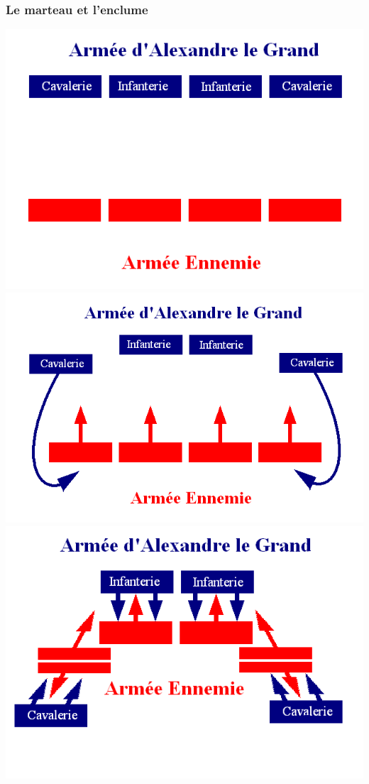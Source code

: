 \documentclass{article}
\begin{document}
\subsubsection{Le marteau et l'enclume}
\includegraphics[width=\linewidth]{../ressources/marteau}
\includegraphics[width=\linewidth]{../ressources/marteau2}
\includegraphics[width=\linewidth]{../ressources/enclume}
\end{document}
